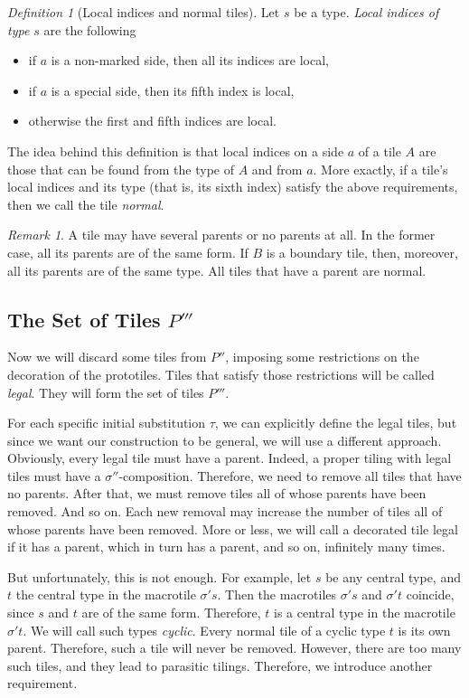 \documentclass[12pt]{article}
\theoremstyle{remark}
\newtheorem{remark}{Remark}
\newtheorem{definition}{Definition}
\begin{document}
\begin{definition}[Local indices and normal tiles]
Let $s$ be a type.  
\emph{Local
indices of type $s$} are the following
\begin{itemize}
\item if $a$ is a non-marked side, then all its indices are local,
\item if $a$ is a special %
side, then its fifth index is  local,
\item otherwise the first and fifth indices are local.
\end{itemize}
The idea behind this definition is that local indices on a side $a$ of a tile $A$ are those that 
can be found from the type  of $A$ and from $a$. More exactly,
if a tile's local indices and its type  (that is, its sixth index) satisfy
the above requirements, then we call the tile \emph{normal}.
\end{definition}


\begin{remark}\label{rem-parent}
A tile may have several parents or no parents at all. In the former case, all its parents
are of the same form. If $B$ is a boundary tile, then, moreover, all its parents
are of the same type. All tiles that have a parent are normal.
\end{remark}

\subsection{The Set of Tiles $P'''$}\label{slt}

Now we will discard some tiles from $P''$, imposing some
restrictions on the decoration
of the prototiles. Tiles that satisfy
those restrictions will be called
\emph{legal}. They will form the set of tiles $P'''$.

For each specific initial substitution $\tau$, we can explicitly define the legal tiles,
but since we want our construction to be general, we will use
a different approach.
Obviously, every legal tile must have a parent.
Indeed, a proper tiling with legal tiles
must have a $\sigma''$-composition.
Therefore, we need to remove all  tiles that have no parents.
After that, we must remove
tiles all of whose parents have been removed. And so on. Each new removal may increase the number
of tiles all of whose parents have been removed. More or less, we will call a decorated tile legal if it has a parent, which in turn
has a parent, and so on, infinitely many times.

But unfortunately, this is not enough. For example, let $s$ be any central type, and $t$ 
the central type in the macrotile $\sigma' s$. Then the macrotiles
$\sigma' s$ and $\sigma' t$ coincide, since $s$ and $t$ are of the same form. Therefore, $t$ is a central type in the macrotile $\sigma' t$.
We will call such types \emph{cyclic}.
Every normal
tile of a cyclic type $t$ 
is its own parent.
Therefore, such a tile will never be removed. However, there are too many such
tiles, and they lead to parasitic tilings.
Therefore, we introduce another requirement.
\end{document}
